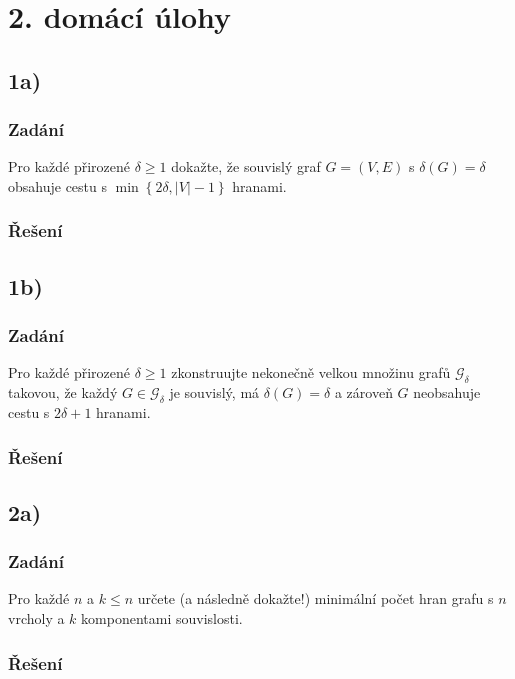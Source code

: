 \documentclass[../main.tex]{subfiles}
\begin{document}
\section*{2. domácí úlohy}

\subsection*{1a)}
\subsubsection*{Zadání}
Pro každé přirozené $\delta\geq1$ dokažte, že souvislý graf
$G=(V,E)$ s $\delta(G) = \delta$ obsahuje cestu s $\min\left\{2\delta, |V| - 1\right\}$
hranami.

\subsubsection*{Řešení}

\subsection*{1b)}
\subsubsection*{Zadání}
Pro každé přirozené $\delta\geq1$ zkonstruujte nekonečně velkou
množinu grafů $\mathcal{G}_\delta$ takovou, že každý $G\in\mathcal{G}_\delta$ je souvislý,
má $\delta(G) = \delta$ a zároveň $G$ neobsahuje cestu s $2\delta +1$ hranami.

\subsubsection*{Řešení}

\subsection*{2a)}
\subsubsection*{Zadání}
Pro každé $n$ a $k\leq n$ určete (a následně dokažte!) minimální počet hran grafu
s $n$ vrcholy a $k$ komponentami souvislosti.

\subsubsection*{Řešení}
\end{document}
